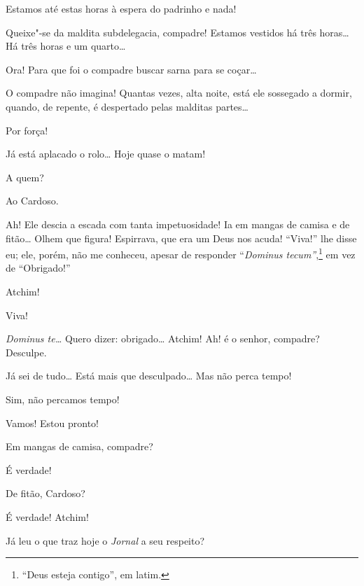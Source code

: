 \begin{linenumbers}
 Estamos até estas horas à espera do padrinho e nada!

 Queixe"-se da maldita subdelegacia, compadre! Estamos vestidos
há três horas\ldots{}  Há três horas e um quarto\ldots{}

 Ora! Para que foi o compadre buscar sarna para se coçar\ldots{}

 O compadre não imagina! Quantas vezes, alta noite, está ele
sossegado a dormir, quando, de
repente, é despertado pelas malditas partes\ldots{}

 Por força!

  Já está aplacado o rolo\ldots{}
 Hoje quase o matam!

  A quem?

 Ao Cardoso.

 Ah! Ele descia a escada com tanta impetuosidade! Ia em mangas
de camisa e de fitão\ldots{} Olhem que
figura! Espirrava, que era um Deus nos acuda! “Viva!” lhe disse eu; ele,
porém, não me conheceu, apesar de
responder ``\textit{Dominus tecum”},\footnote{ “Deus esteja contigo”, em latim.}
em vez de ``Obrigado!”



  Atchim!

 Viva!

 \textit{Dominus te\ldots{}} Quero dizer: obrigado\ldots{} Atchim! Ah! é o
senhor, compadre? Desculpe.

 Já sei de tudo\ldots{} Está mais que desculpado\ldots{} Mas não perca
tempo!

 Sim, não percamos tempo!

 Vamos!  Estou pronto!

 Em mangas de camisa, compadre?

 É verdade! 

 De fitão, Cardoso?

 É verdade!  Atchim!

 Já leu o que traz hoje o \textit{Jornal} a seu respeito?


\end{linenumbers}
